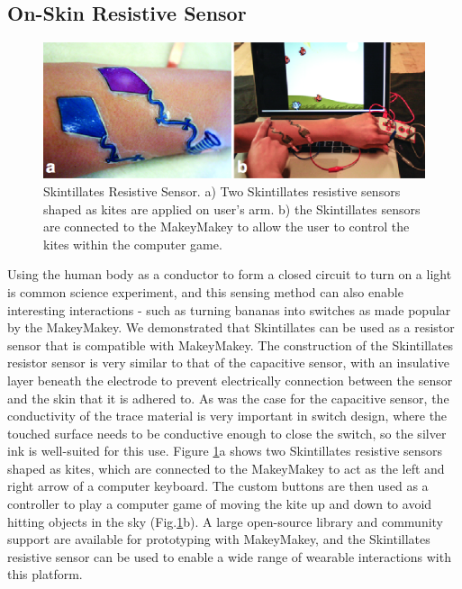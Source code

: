 \documentclass{sigchi}
\begin{document}
\subsection {On-Skin Resistive Sensor}
\begin{figure} [h!]
\centering
\includegraphics[width=1\columnwidth]{figures/Figure9}
\caption{Skintillates Resistive Sensor. a) Two Skintillates resistive sensors shaped as kites are applied on user's arm. b) the Skintillates sensors are connected to the MakeyMakey to allow the user to control the kites within the computer game.}
\vspace{-8pt}
\label{fig:resisitve}
\end{figure}
Using the human body as a conductor to form a closed circuit to turn on a light is common science experiment, and this sensing method can also enable interesting interactions - such as turning bananas into switches as made popular by the MakeyMakey. We demonstrated that Skintillates can be used as a resistor sensor that is compatible with MakeyMakey. The construction of the Skintillates resistor sensor is very similar to that of the capacitive sensor, with an insulative layer beneath the electrode to prevent electrically connection between the sensor and the skin that it is adhered to. As was the case for the capacitive sensor, the conductivity of the trace material is very important in switch design, where the touched surface needs to be conductive enough to close the switch, so the silver ink is well-suited for this use. Figure \ref{fig:resisitve}a shows two Skintillates resistive sensors shaped as kites, which are connected to the MakeyMakey to act as the left and right arrow of a computer keyboard. The custom buttons are then used as a controller to play a computer game of moving the kite up and down to avoid hitting objects in the sky (Fig.\ref{fig:resisitve}b). A large open-source library and community support are available for prototyping with MakeyMakey, and the Skintillates resistive sensor can be used to enable a wide range of wearable interactions with this platform. 
\end{document}
